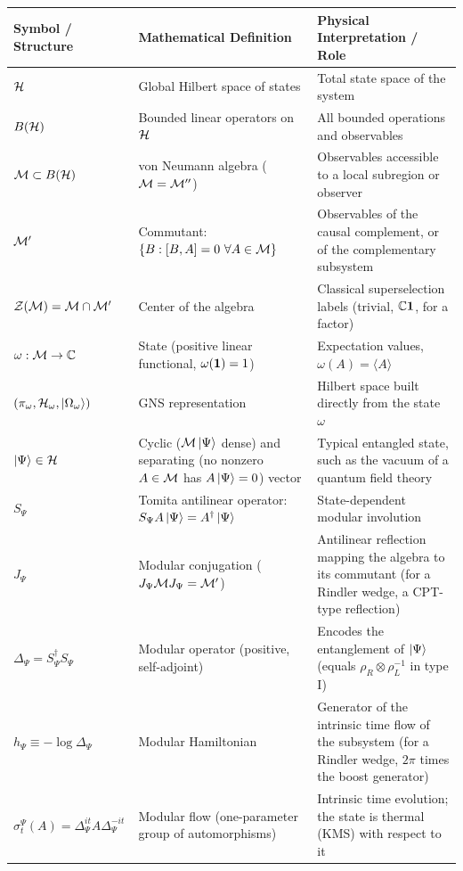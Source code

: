 \begin{table}[t]
\centering
\footnotesize
\begin{tabularx}{\textwidth}{@{}l >{\raggedright\arraybackslash}p{4.8cm} >{\raggedright\arraybackslash}X@{}}
\toprule
\textbf{Symbol / Structure} & \textbf{Mathematical Definition} & \textbf{Physical Interpretation / Role} \\
\midrule
$\mathcal{H}$ & Global Hilbert space of states & Total state space of the system \\
$B(\mathcal{H})$ & Bounded linear operators on $\mathcal{H}$ & All bounded operations and observables \\
$\mathcal{M} \subset B(\mathcal{H})$ & von Neumann algebra ($\mathcal{M} = \mathcal{M}''$) & Observables accessible to a local subregion or observer \\
$\mathcal{M}'$ & Commutant: $\{B : [B,A]=0\ \forall A \in \mathcal{M}\}$ & Observables of the causal complement, or of the complementary subsystem \\
$\mathcal{Z}(\mathcal{M}) = \mathcal{M} \cap \mathcal{M}'$ & Center of the algebra & Classical superselection labels (trivial, $\mathbb{C}\mathbf{1}$, for a factor) \\
$\omega: \mathcal{M} \to \mathbb{C}$ & State (positive linear functional, $\omega(\mathbf{1})=1$) & Expectation values, $\omega(A) = \langle A \rangle$ \\
$(\pi_\omega, \mathcal{H}_\omega, \ket{\Omega_\omega})$ & GNS representation & Hilbert space built directly from the state $\omega$ \\
$\ket\Psi \in \mathcal{H}$ & Cyclic ($\mathcal{M}\ket\Psi$ dense) and separating (no nonzero $A\in\mathcal{M}$ has $A\ket\Psi=0$) vector & Typical entangled state, such as the vacuum of a quantum field theory \\
$S_\Psi$ & Tomita antilinear operator: $S_\Psi A\ket\Psi = A^\dagger\ket\Psi$ & State-dependent modular involution \\
$J_\Psi$ & Modular conjugation ($J_\Psi \mathcal{M} J_\Psi = \mathcal{M}'$) & Antilinear reflection mapping the algebra to its commutant (for a Rindler wedge, a CPT-type reflection) \\
$\Delta_\Psi = S_\Psi^\dagger S_\Psi$ & Modular operator (positive, self-adjoint) & Encodes the entanglement of $\ket\Psi$ (equals $\rho_R\otimes\rho_L^{-1}$ in type I) \\
$h_\Psi \equiv -\log\Delta_\Psi$ & Modular Hamiltonian & Generator of the intrinsic time flow of the subsystem (for a Rindler wedge, $2\pi$ times the boost generator) \\
$\sigma_t^\Psi(A) = \Delta_\Psi^{it} A \Delta_\Psi^{-it}$ & Modular flow (one-parameter group of automorphisms) & Intrinsic time evolution; the state is thermal (KMS) with respect to it \\

\end{tabularx}
\end{table}
